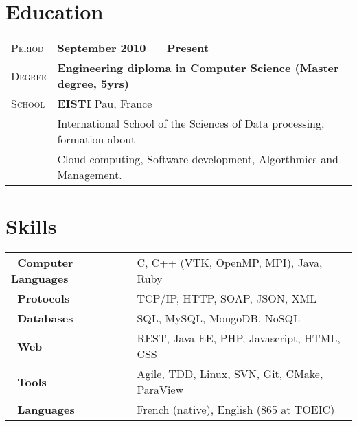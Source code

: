 \documentclass[a4paper, oneside, final]{scrartcl} %
\newcommand{\gray}{\rowcolor[gray]{.90}} %
\begin{document}
\begin{center}

\section{Education}

\begin{tabularx}{1\linewidth}{>{\raggedleft\scshape}p{2cm}X}
  \gray Period & \textbf{September 2010 --- Present}\\
    \gray Degree & \textbf{Engineering diploma in Computer Science (Master degree, 5yrs)}\\
  \gray School & \textbf{EISTI} \hfill Pau, France\\
  & International School of the Sciences of Data processing, formation about\\
  & Cloud computing, Software development, Algorthmics and Management.
\end{tabularx}


\section{Skills}

\begin{tabular}{ @{} >{\bfseries}l @{\hspace{4ex}} l }
  ~Computer Languages & C, C++ (VTK, OpenMP, MPI), Java, Ruby \\
  ~Protocols          & TCP/IP, HTTP, SOAP, JSON, XML\\
  ~Databases          & SQL, MySQL, MongoDB, NoSQL \\
  ~Web                & REST, Java EE, PHP, Javascript, HTML, CSS \\
  ~Tools              & Agile, TDD, Linux, SVN, Git, CMake, ParaView\\
  ~Languages          & French (native), English (865 at TOEIC)
\end{tabular}





\end{center}
\end{document}

